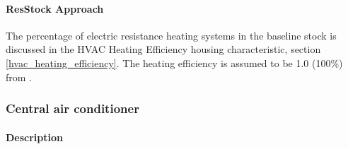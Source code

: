 \paragraph{ResStock Approach}

The percentage of electric resistance heating systems in the baseline stock is discussed in the HVAC Heating Efficiency housing characteristic, section \ref{hvac_heating_efficiency}. The heating efficiency is assumed to be 1.0 (100\%) from \cite{Wilson2014}. 

\subsubsection{Central air conditioner}

\paragraph{Description}

